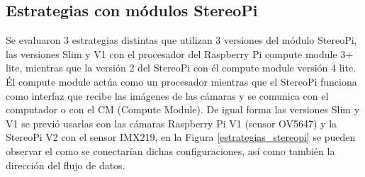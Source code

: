 \subsection{Estrategias con módulos StereoPi}
Se evaluaron 3 estrategias distintas que utilizan 3 versiones del módulo StereoPi, las versiones Slim y V1 con el procesador del Raspberry Pi compute module 3+ lite, mientras que la versión 2 del StereoPi con él compute module versión 4 lite. Él compute module actúa como un procesador mientras que el StereoPi funciona como interfaz que recibe las imágenes de las cámaras y se comunica con el computador o con el CM (Compute Module). De igual forma las versiones Slim y V1 se previó usarlas con las cámaras Raspberry Pi V1 (sensor OV5647) y la StereoPi V2 con el sensor IMX219, en la Figura \ref{estrategias_stereopi} se pueden observar el como se conectarían dichas configuraciones, así como también la dirección del flujo de datos.
